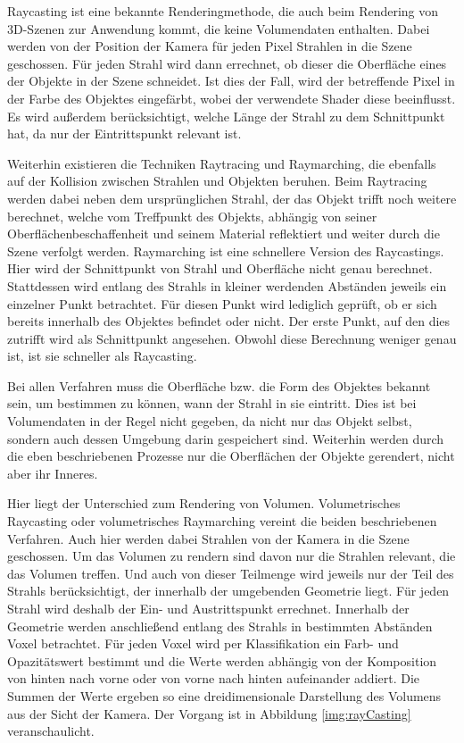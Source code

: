 Raycasting ist eine bekannte Renderingmethode, die auch beim Rendering von 3D-Szenen zur Anwendung kommt, die keine Volumendaten enthalten.
Dabei werden von der Position der Kamera für jeden Pixel Strahlen in die Szene geschossen. Für jeden Strahl wird dann errechnet, ob dieser die Oberfläche eines der Objekte in der Szene schneidet. Ist dies der Fall, wird der betreffende Pixel in der Farbe des Objektes eingefärbt, wobei der verwendete Shader diese beeinflusst. Es wird außerdem berücksichtigt, welche Länge der Strahl zu dem Schnittpunkt hat, da nur der Eintrittspunkt relevant ist.

Weiterhin existieren die Techniken Raytracing und Raymarching, die ebenfalls auf der Kollision zwischen Strahlen und Objekten beruhen.
Beim Raytracing werden dabei neben dem ursprünglichen Strahl, der das Objekt trifft noch weitere berechnet, welche vom Treffpunkt des Objekts, abhängig von seiner Oberflächenbeschaffenheit und seinem Material reflektiert und weiter durch die Szene verfolgt werden.
Raymarching ist eine schnellere Version des Raycastings. 
Hier wird der Schnittpunkt von Strahl und Oberfläche nicht genau berechnet. Stattdessen wird entlang des Strahls in kleiner werdenden Abständen jeweils ein einzelner Punkt betrachtet. Für diesen Punkt wird lediglich geprüft, ob er sich bereits innerhalb des Objektes befindet oder nicht. Der erste Punkt, auf den dies zutrifft wird als Schnittpunkt angesehen. Obwohl diese Berechnung weniger genau ist, ist sie schneller als Raycasting.

Bei allen Verfahren muss die Oberfläche bzw. die Form des Objektes bekannt sein, um bestimmen zu können, wann der Strahl in sie eintritt. Dies ist bei Volumendaten in der Regel nicht gegeben, da nicht nur das Objekt selbst, sondern auch dessen Umgebung darin gespeichert sind. Weiterhin werden durch die eben beschriebenen Prozesse nur die Oberflächen der Objekte gerendert, nicht aber ihr Inneres.

Hier liegt der Unterschied zum Rendering von Volumen. Volumetrisches Raycasting oder volumetrisches Raymarching vereint die beiden beschriebenen Verfahren. Auch hier werden dabei Strahlen von der Kamera in die Szene geschossen. Um das Volumen zu rendern sind davon nur die Strahlen relevant, die das Volumen treffen. Und auch von dieser Teilmenge wird jeweils nur der Teil des Strahls berücksichtigt, der innerhalb der umgebenden Geometrie liegt. Für jeden Strahl wird deshalb der Ein- und Austrittspunkt errechnet. Innerhalb der Geometrie werden anschließend entlang des Strahls in bestimmten Abständen Voxel betrachtet. Für jeden Voxel wird per Klassifikation ein Farb- und Opazitätswert bestimmt und die Werte werden abhängig von der Komposition von hinten nach vorne oder von vorne nach hinten aufeinander addiert. Die Summen der Werte ergeben so eine dreidimensionale Darstellung des Volumens aus der Sicht der Kamera. Der Vorgang ist in Abbildung \ref{img:rayCasting} veranschaulicht.


